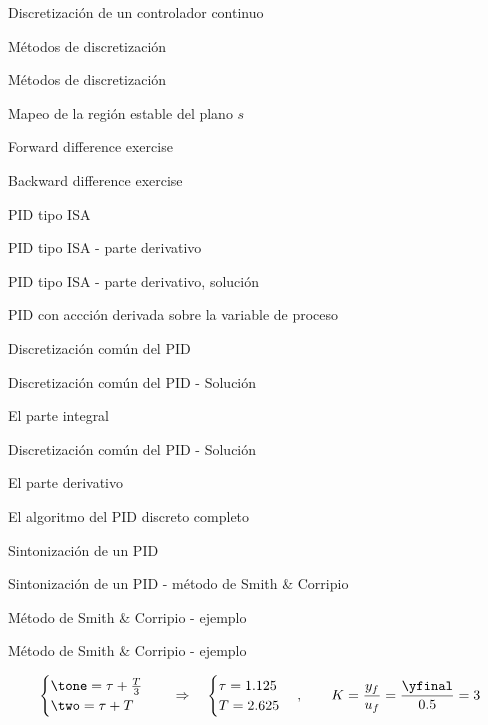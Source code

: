 \documentclass[presentation,aspectratio=1610]{beamer}
\begin{document}
\begin{frame}[label={sec:org86d23da}]{Discretización de un controlador continuo}
\begin{frame}[label={sec:org3ca2082}]{Métodos de discretización}
\begin{frame}[label={sec:orga78cff2}]{Métodos de discretización}
\begin{frame}[label={sec:org28bff53}]{Mapeo de la región estable del plano \(s\)}
\begin{frame}[label={sec:org9bb57fa}]{Forward difference exercise}
\begin{frame}[label={sec:orgaf8c1b0}]{Backward difference exercise}
\begin{frame}[label={sec:orgb2215e6}]{PID tipo ISA}
\begin{frame}[label={sec:orga06296a}]{PID tipo ISA - parte derivativo}
\begin{frame}[label={sec:org978e098}]{PID tipo ISA - parte derivativo, solución}
\begin{frame}[label={sec:orgf3b475b}]{PID con accción derivada sobre la variable de proceso}
\begin{frame}[label={sec:org5c3258e}]{Discretización común del PID}
\begin{frame}[label={sec:org95130b5}]{Discretización común del PID - Solución}
\begin{block}{El parte integral}
\begin{frame}[label={sec:org35f72c2}]{Discretización común del PID - Solución}
\begin{block}{El parte derivativo}
\begin{frame}[label={sec:org34749bc}]{El algoritmo del PID discreto completo}
\begin{frame}[label={sec:orgaefa60b}]{Sintonización de un PID}
\begin{frame}[label={sec:orge6db74e}]{Sintonización de un PID - método de Smith \& Corripio}
\begin{frame}[label={sec:org7d7b902}]{Método de Smith \& Corripio - ejemplo}
\begin{frame}[label={sec:org0f77e26}]{Método de Smith \& Corripio - ejemplo}
\begin{center}
\end{center}
\[ \begin{cases} \tone = \tau + \frac{T}{3}\\ \two = \tau + T \end{cases} \quad \Rightarrow \quad \begin{cases} \tau = \tdelay \\ T = \Tcnst \end{cases}, \qquad  K = \frac{y_f}{u_f} = \frac{\yfinal}{\uampl} = \ggain \]
\end{frame}


\end{frame}
\end{frame}
\end{frame}
\end{frame}
\end{block}
\end{frame}
\end{block}
\end{frame}
\end{frame}
\end{frame}
\end{frame}
\end{frame}
\end{frame}
\end{frame}
\end{frame}
\end{frame}
\end{frame}
\end{frame}
\end{frame}
\end{document}
